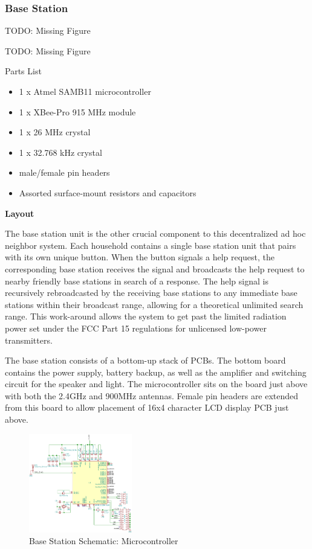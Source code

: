 \documentclass[journal,compsoc]{IEEEtran}
\begin{document}
\subsubsection{Base Station}

TODO: Missing Figure

TODO: Missing Figure

Parts List
\begin{itemize}
  \item 1 x Atmel SAMB11 microcontroller
  \item 1 x XBee-Pro 915 MHz module
  \item 1 x 26 MHz crystal
  \item 1 x 32.768 kHz crystal
  \item male/female pin headers
  \item Assorted surface-mount resistors and capacitors
\end{itemize}

\textbf {Layout}

The base station unit is the other crucial component to this decentralized ad hoc neighbor system. Each household contains a single base station unit that pairs with its own unique button. When the button signals a help request, the corresponding base station receives the signal and broadcasts the help request to nearby friendly base stations in search of a response. The help signal is recursively rebroadcasted by the receiving base stations to any immediate base stations within their broadcast range, allowing for a theoretical unlimited search range. This work-around allows the system to get past the limited radiation power set under the FCC Part 15 regulations for unlicensed low-power transmitters.

The base station consists of a bottom-up stack of PCBs. The bottom board contains the power supply, battery backup, as well as the amplifier and switching circuit for the speaker and light. The microcontroller sits on the board just above with both the 2.4GHz and 900MHz antennas. Female pin headers are extended from this board to allow placement of 16x4 character LCD display PCB just above.

\begin{figure}[ht] 	%
\centering
\includegraphics[width=0.4\textwidth]{base-schematic-uc.png}
\caption{ \space Base Station Schematic: Microcontroller}
\label{base-sch-uc}
\end{figure}
\end{document}
